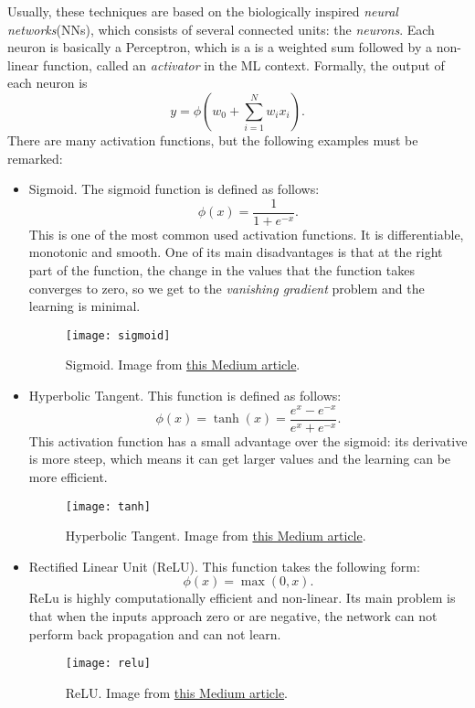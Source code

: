 Usually, these techniques are based on the biologically inspired \emph{neural networks}(NNs), which consists of several connected units: the \emph{neurons}. Each neuron is basically a Perceptron, which is a is a weighted sum followed by a non-linear function, called an \emph{activator} in the ML context. Formally, the output of each neuron is 
\[
y = \phi\left(w_0 +\sum_{i = 1}^N w_i x_i \right) .   
\]
There are many activation functions, but the following examples must be remarked:
\begin{itemize}
\item Sigmoid. The sigmoid function is defined as follows:
\[
\phi(x) = \frac{1}{1+ e^{-x}}.
\]
This is one of the most common used activation functions. It is differentiable, monotonic and smooth. One of its main disadvantages is that at the right part of the function, the change in the values that the function takes converges to zero, so we get to the \emph{vanishing gradient} problem and the learning is minimal.

\begin{figure}[H]
    \centering
    \texttt{[image: sigmoid]}
    \caption{Sigmoid. Image from \href{https://xzz201920.medium.com/activation-functions-linear-non-linear-in-deep-learning-relu-sigmoid-softmax-swish-leaky-relu-a6333be712ea}{this Medium article}. } \label{fig:sigmoid}
\end{figure}

\item Hyperbolic Tangent. This function is defined as follows:
\[
\phi(x) = \operatorname{tanh}(x) =  \frac{e^x - e^{-x}}{e^x + e^{-x}}.    
\]
This activation function has a small advantage over the sigmoid: its derivative is more steep, which means it can get larger values and the learning can be more efficient.

\begin{figure}[H]
    \centering
    \texttt{[image: tanh]}
    \caption{Hyperbolic Tangent. Image from \href{https://xzz201920.medium.com/activation-functions-linear-non-linear-in-deep-learning-relu-sigmoid-softmax-swish-leaky-relu-a6333be712ea}{this Medium article}. } \label{fig:tanh}
\end{figure}

\item Rectified Linear Unit (ReLU). This function takes the following form:
\[
\phi(x) = \max\left(0,x\right).    
\]
ReLu is highly computationally efficient and non-linear. Its main problem is that when the inputs approach zero or are negative, the network can not perform back propagation and can not learn.

\begin{figure}[H]
    \centering
    \texttt{[image: relu]}
    \caption{ReLU. Image from \href{https://xzz201920.medium.com/activation-functions-linear-non-linear-in-deep-learning-relu-sigmoid-softmax-swish-leaky-relu-a6333be712ea}{this Medium article}. } \label{fig:relu}
\end{figure}
\end{itemize}



